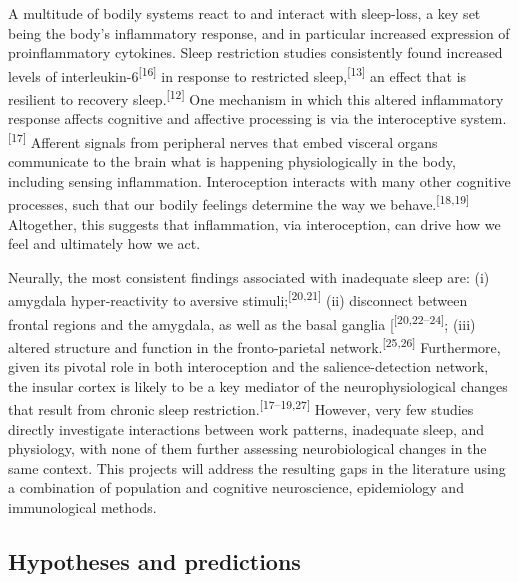 \documentclass[
  english,
  man]{apa6}
\begin{document}
A multitude of bodily systems react to and interact with sleep-loss, a key set being the body's inflammatory response, and in particular increased expression of proinflammatory cytokines. Sleep restriction studies consistently found increased levels of interleukin-6\textsuperscript{{[}16{]}} in response to restricted sleep,\textsuperscript{{[}13{]}} an effect that is resilient to recovery sleep.\textsuperscript{{[}12{]}} One mechanism in which this altered inflammatory response affects cognitive and affective processing is via the interoceptive system.\textsuperscript{{[}17{]}} Afferent signals from peripheral nerves that embed visceral organs communicate to the brain what is happening physiologically in the body, including sensing inflammation. Interoception interacts with many other cognitive processes, such that our bodily feelings determine the way we behave.\textsuperscript{{[}18,19{]}} Altogether, this suggests that inflammation, via interoception, can drive how we feel and ultimately how we act.

Neurally, the most consistent findings associated with inadequate sleep are: (i) amygdala hyper-reactivity to aversive stimuli;\textsuperscript{{[}20,21{]}} (ii) disconnect between frontal regions and the amygdala, as well as the basal ganglia {[}\textsuperscript{{[}20,22--24{]}}; (iii) altered structure and function in the fronto-parietal network.\textsuperscript{{[}25,26{]}} Furthermore, given its pivotal role in both interoception and the salience-detection network, the insular cortex is likely to be a key mediator of the neurophysiological changes that result from chronic sleep restriction.\textsuperscript{{[}17--19,27{]}} However, very few studies directly investigate interactions between work patterns, inadequate sleep, and physiology, with none of them further assessing neurobiological changes in the same context. This projects will address the resulting gaps in the literature using a combination of population and cognitive neuroscience, epidemiology and immunological methods.

\hypertarget{hypotheses-and-predictions}{%
\subsection{Hypotheses and predictions}\label{hypotheses-and-predictions}}

\begingroup
\setlength{\parindent}{-0.5in}
\setlength{\leftskip}{0.5in}
\end{document}
